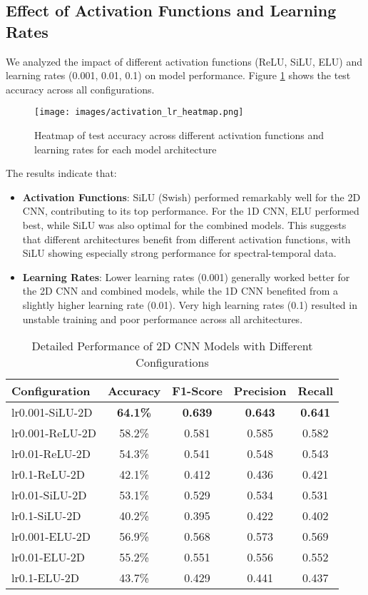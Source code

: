 \subsection{Effect of Activation Functions and Learning Rates}

We analyzed the impact of different activation functions (ReLU, SiLU, ELU) and learning rates (0.001, 0.01, 0.1) on model performance. Figure \ref{fig:activation_lr_heatmap} shows the test accuracy across all configurations.

\begin{figure}[h]
    \centering
    \texttt{[image: images/activation\_lr\_heatmap.png]}
    \caption{Heatmap of test accuracy across different activation functions and learning rates for each model architecture}
    \label{fig:activation_lr_heatmap}
\end{figure}

The results indicate that:

\begin{itemize}
    \item \textbf{Activation Functions}: SiLU (Swish) performed remarkably well for the 2D CNN, contributing to its top performance. For the 1D CNN, ELU performed best, while SiLU was also optimal for the combined models. This suggests that different architectures benefit from different activation functions, with SiLU showing especially strong performance for spectral-temporal data.
    
    \item \textbf{Learning Rates}: Lower learning rates (0.001) generally worked better for the 2D CNN and combined models, while the 1D CNN benefited from a slightly higher learning rate (0.01). Very high learning rates (0.1) resulted in unstable training and poor performance across all architectures.
\end{itemize}

\begin{table}[h]
\centering
\caption{Detailed Performance of 2D CNN Models with Different Configurations}
\label{tab:2d_results}
\begin{tabular}{@{}lcccc@{}}
\toprule
\textbf{Configuration} & \textbf{Accuracy} & \textbf{F1-Score} & \textbf{Precision} & \textbf{Recall} \\
\midrule
lr0.001-SiLU-2D & \textbf{64.1\%} & \textbf{0.639} & \textbf{0.643} & \textbf{0.641} \\
lr0.001-ReLU-2D & 58.2\% & 0.581 & 0.585 & 0.582 \\
lr0.01-ReLU-2D & 54.3\% & 0.541 & 0.548 & 0.543 \\
lr0.1-ReLU-2D & 42.1\% & 0.412 & 0.436 & 0.421 \\
lr0.01-SiLU-2D & 53.1\% & 0.529 & 0.534 & 0.531 \\
lr0.1-SiLU-2D & 40.2\% & 0.395 & 0.422 & 0.402 \\
lr0.001-ELU-2D & 56.9\% & 0.568 & 0.573 & 0.569 \\
lr0.01-ELU-2D & 55.2\% & 0.551 & 0.556 & 0.552 \\
lr0.1-ELU-2D & 43.7\% & 0.429 & 0.441 & 0.437 \\
\bottomrule
\end{tabular}
\end{table}

